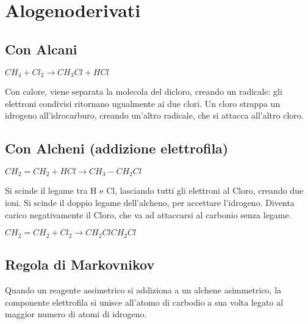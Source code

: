 \documentclass{article}
\title{\jobname}
\author{Eugenio Animali}
\begin{document}
\maketitle

\section{Alogenoderivati}

\subsection{Con Alcani}

$CH_4 + Cl_2\to CH_3Cl + HCl$

Con calore, viene separata la molecola del dicloro, creando un radicale: gli elettroni condivisi ritornano ugualmente ai due clori. Un cloro strappa un idrogeno all'idrocarburo, creando un'altro radicale, che si attacca all'altro cloro.

\subsection{Con Alcheni (addizione elettrofila)}

$CH_2=CH_2 + HCl \to CH_3-CH_2Cl$

Si scinde il legame tra H e Cl, lasciando tutti gli elettroni al Cloro, creando due ioni. Si scinde il doppio legame dell'alcheno, per accettare l'idrogeno. Diventa carico negativamente il Cloro, che va ad attaccarsi al carbonio senza legame.

$CH_2=CH_2+Cl_2\to CH_2ClCH_2Cl$

\subsection{Regola di Markovnikov}

Quando un reagente assimetrico si addiziona a un alchene asimmetrico, la componente elettrofila si unisce all'atomo di carbodio a sua volta legato al maggior numero di atomi di idrogeno.
\end{document}
